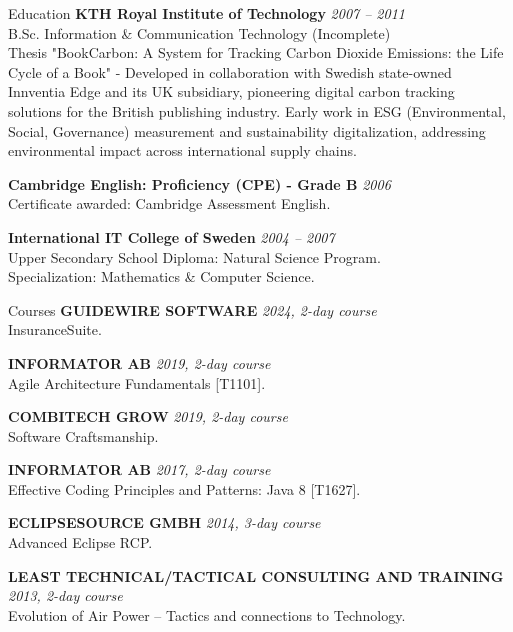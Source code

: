 \documentclass{resume}
\begin{document}
\begin{rSection}{Education}
{\bf KTH Royal Institute of Technology}
\hfill {\em 2007 -- 2011 } \\
{ B.Sc. Information \& Communication Technology (Incomplete) } \\
{ Thesis "BookCarbon: A System for Tracking Carbon Dioxide Emissions: the Life Cycle of a Book" - Developed in collaboration with Swedish state-owned Innventia Edge and its UK subsidiary, pioneering digital carbon tracking solutions for the British publishing industry. Early work in ESG (Environmental, Social, Governance) measurement and sustainability digitalization, addressing environmental impact across international supply chains. }

{\bf Cambridge English: Proficiency (CPE) - Grade B}
\hfill {\em 2006 } \\
{ Certificate awarded: Cambridge Assessment English. }

{\bf International IT College of Sweden}
\hfill {\em 2004 -- 2007 } \\
{ Upper Secondary School Diploma: Natural Science Program. } \\
{ Specialization: Mathematics \& Computer Science. }
\end{rSection}

\begin{rSection}{Courses}
{\bf GUIDEWIRE SOFTWARE}
\hfill {\em 2024, 2-day course } \\
{ InsuranceSuite. } %

{\bf INFORMATOR AB}
\hfill {\em 2019, 2-day course } \\
{ Agile Architecture Fundamentals [T1101]. } %

{\bf COMBITECH GROW}
\hfill {\em 2019, 2-day course } \\
{ Software Craftsmanship. } %

{\bf INFORMATOR AB}
\hfill {\em 2017, 2-day course } \\
{ Effective Coding Principles and Patterns: Java 8 [T1627]. } %

{\bf ECLIPSESOURCE GMBH}
\hfill {\em 2014, 3-day course } \\
{ Advanced Eclipse RCP. } %

{\bf LEAST TECHNICAL/TACTICAL CONSULTING AND TRAINING}
\hfill {\em 2013, 2-day course } \\
{ Evolution of Air Power – Tactics and connections to Technology. } %
\end{rSection}
\end{document}
